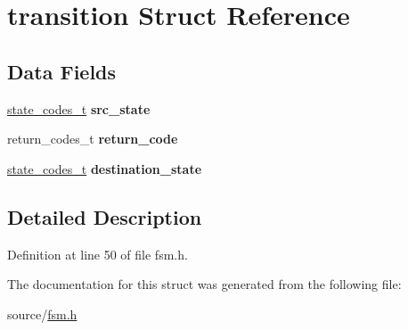 \hypertarget{structtransition}{}\section{transition Struct Reference}
\label{structtransition}
\subsection*{Data Fields}
\begin{DoxyCompactItemize}
\item 
\mbox{\label{structtransition_aface180c1b7e268ee434c9345069ef9a}} 
\hyperlink{fsm_8h_a24468ac18da8c9095490b17865df4fdd}{state\+\_\+codes\+\_\+t} {\bfseries src\+\_\+state}
\item 
\mbox{\label{structtransition_ae9946d3b2fde2a6af4a08763cbdef682}} 
return\+\_\+codes\+\_\+t {\bfseries return\+\_\+code}
\item 
\mbox{\label{structtransition_a8e0c6c5a7221b92e8722acdb01627a5f}} 
\hyperlink{fsm_8h_a24468ac18da8c9095490b17865df4fdd}{state\+\_\+codes\+\_\+t} {\bfseries destination\+\_\+state}
\end{DoxyCompactItemize}


\subsection{Detailed Description}


Definition at line 50 of file fsm.\+h.



The documentation for this struct was generated from the following file\+:\begin{DoxyCompactItemize}
\item 
source/\hyperlink{fsm_8h}{fsm.\+h}\end{DoxyCompactItemize}
